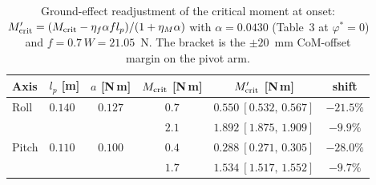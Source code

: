 %
%
%

\begin{table}[!t]
\caption{Ground-effect readjustment of the critical moment at onset:
$M'_{\rm crit} = (M_{\rm crit} - \eta_f\alpha f l_p)/(1+\eta_M\alpha)$
with $\alpha = 0.0430$ (Table~3 at $\varphi^\ast = 0$) and
$f = 0.7\,W = 21.05$~N. The bracket is the $\pm 20$~mm CoM-offset
margin on the pivot arm.}
\label{tab:ge_mcrit}
\centering
\begin{tabular}{@{}llcccc@{}}
\toprule
Axis & $l_p$ [m] & $a$ [N\,m] & $M_{\rm crit}$ [N\,m] &
$M'_{\rm crit}$ [N\,m] & shift\\
\midrule
Roll  & $0.140$ & $0.127$ & $0.7$ & $0.550\ [0.532,\,0.567]$ & $-21.5\%$\\
      &         &         & $2.1$ & $1.892\ [1.875,\,1.909]$ & $-9.9\%$\\
\addlinespace[2pt]
Pitch & $0.110$ & $0.100$ & $0.4$ & $0.288\ [0.271,\,0.305]$ & $-28.0\%$\\
      &         &         & $1.7$ & $1.534\ [1.517,\,1.552]$ & $-9.7\%$\\
\bottomrule
\end{tabular}
\end{table}

%
